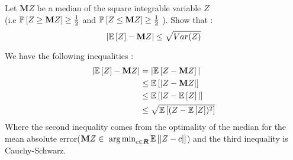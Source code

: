 \begin{exercise}{}
	Let $ \textbf{M}Z $ be a median of the square integrable variable $ Z $\\ (i.e $ \mathbb{P}\left[Z\geq \textbf{M}Z\right] \geq \frac{1}{2} $ and $ \mathbb{P}\left[Z\leq \textbf{M}Z\right] \geq \frac{1}{2}$ ). Show that :
\begin{equation*}
	|\mathbb{E}\left[Z\right] - \textbf{M}Z| \leq \sqrt{Var(Z)}
\end{equation*}
\end{exercise}

\begin{solution}
	We have the following inequalities :
\begin{align*}
	|\mathbb{E}\left[Z\right] - \textbf{M}Z| &= |\mathbb{E}\left[Z - \textbf{M}Z\right]| \\
			       &\leq \mathbb{E}\left[|Z - \textbf{M}Z|\right] \\
			       &\leq \mathbb{E}\left[|Z - \mathbb{E}\left[Z\right]|\right] \\
			       &\leq \sqrt{\mathbb{E}\left[(Z- \mathbb{E}\left[Z\right])^{2}\right]}
\end{align*}
Where the second inequality comes from the optimality of the median for the mean absolute error($ \textbf{M}Z \in \mathop{\mbox{ arg\,min}}_{c\in\boldsymbol{R}} \mathbb{E}\left[|Z-c|\right] $) and the third inequality is Cauchy-Schwarz.
\end{solution}
